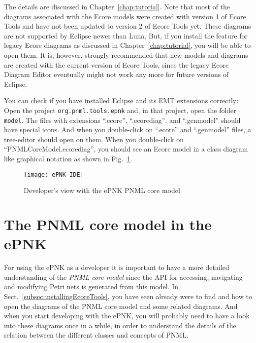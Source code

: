 The details are discussed in Chapter~\ref{chap:tutorial}. Note that most of
the diagrams associated with the Ecore models were created with version 1 of
Ecore Tools and have not been updated to version 2 of Ecore Tools yet. These
diagrams are not supported by Eclipse newer than Luna. But, if you install
the feature for legacy Ecore diagrams as discussed in Chapter~\ref{chap:tutorial},
you will be able to open them. It is, however, strongly recommended that
new models and diagrams are created with the current version of Ecore Tools,
since the legacy Ecore Diagram Editor eventually might not work any more for
future versions of Eclipse. 

You can check if you have installed Eclipse and its EMT extensions correctly:
Open the project {\tt org.pnml.tools.epnk} and, in that project, open the folder
{\tt model}. The files with extensions ``.ecore'', ``.ecorediag'', and ``.genmodel''
should have special icons. And when you double-click on ``.ecore'' and
``.genmodel'' files, a tree-editor should open on them. When you double-click
on ``PNMLCoreModel.ecorediag'', you should see an Ecore model in a class diagram
like graphical notation as shown in Fig.~\ref{fig:ePNK-IDE}. 

\begin{figure}[hbt!!]
  \centerline{\texttt{[image: ePNK-IDE]}}
  \caption{Developer's view with the ePNK PNML core model}
  \label{fig:ePNK-IDE}
\end{figure}


\section{The PNML core model in the ePNK}
\label{sec:ePNK-PNMLCoreModel}

For using the ePNK as a developer it is important to have a more
detailed understanding of the \emph{PNML core model} since the API
for accessing, navigating and modifying Petri nets is generated
from this model.  In Sect.~\ref{subsec:installingEcoreTools}, you have seen
already were to find and how to open the diagrams of the PNML core model
and some related diagrams. And when you start developing with the
ePNK, you will probably need to have a look into these diagrams
once in a while, in order to understand the details of the relation
between the different classes and concepts of PNML. 

